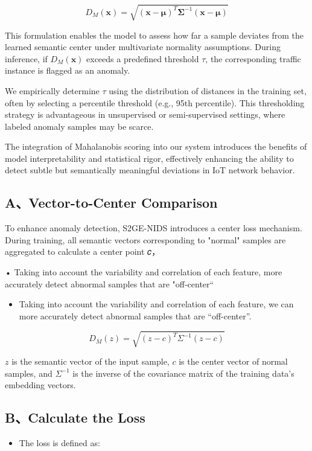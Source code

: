 \begin{ZhChapter}
{\[
D_M(\mathbf{x}) = \sqrt{(\mathbf{x} - \boldsymbol{\mu})^T \boldsymbol{\Sigma}^{-1} (\mathbf{x} - \boldsymbol{\mu})}
\]



This formulation enables the model to assess how far a sample deviates from the learned semantic center under multivariate normality assumptions. During inference, if $D_M(\mathbf{x})$ exceeds a predefined threshold $\tau$, the corresponding traffic instance is flagged as an anomaly.

We empirically determine $\tau$ using the distribution of distances in the training set, often by selecting a percentile threshold (e.g., 95th percentile). This thresholding strategy is advantageous in unsupervised or semi-supervised settings, where labeled anomaly samples may be scarce.

The integration of Mahalanobis scoring into our system introduces the benefits of model interpretability and statistical rigor, effectively enhancing the ability to detect subtle but semantically meaningful deviations in IoT network behavior.


\subsection*{A、Vector-to-Center Comparison}
To enhance anomaly detection, S2GE-NIDS introduces a center loss mechanism. During training, all semantic vectors corresponding to "normal" samples are aggregated to calculate a center point  𝑐，

•	Taking into account the variability and correlation of each feature, more accurately detect abnormal samples that are "off-center“

\begin{itemize}
    \item Taking into account the variability and correlation of each feature, we can more accurately detect abnormal samples that are ``off-center''.
\end{itemize}

\begin{equation}
D_M(z) = \sqrt{(z - c)^T \Sigma^{-1} (z - c)}
\label{eq:mahalanobis}
\end{equation}

$z$ is the semantic vector of the input sample, $c$ is the center vector of normal samples, and $\Sigma^{-1}$ is the inverse of the covariance matrix of the training data's embedding vectors.

\subsection*{B、Calculate the Loss}
\begin{itemize}
    \item The loss is defined as:
\end{itemize}

}
\end{ZhChapter}
